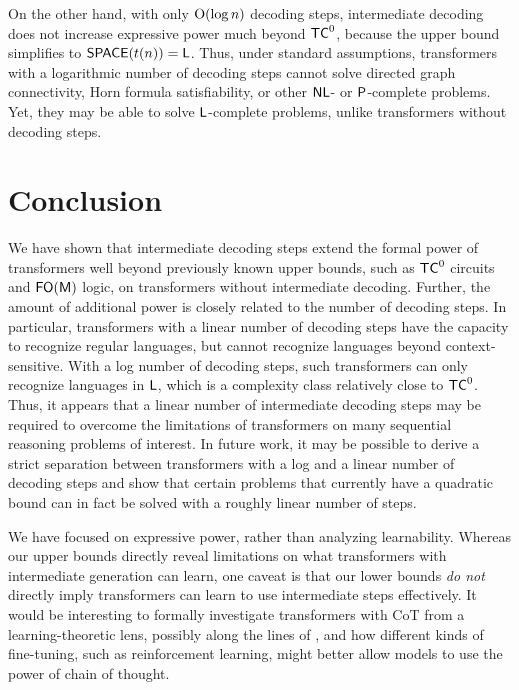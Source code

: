 \documentclass{article} %
\begin{document}
On the other hand, with only $\O(\log n)$ decoding steps, intermediate decoding does not increase expressive power much beyond $\TC^0$, because the upper bound simplifies to $\SPACE(t(n)) = \L$.
Thus, under standard assumptions, transformers with a logarithmic number of decoding steps cannot solve directed graph connectivity, Horn formula satisfiability, or other $\NL$- or $\P$-complete problems. Yet, they may be able to solve $\L$-complete problems, unlike transformers without decoding steps.

\section{Conclusion}

We have shown that intermediate decoding steps extend the formal power of transformers well beyond previously known upper bounds, such as $\TC^0$ circuits and $\FOM$ logic, on transformers without intermediate decoding. Further, the amount of additional power is closely related to the number of decoding steps. In particular, transformers with a linear number of decoding steps have the capacity to recognize regular languages, but cannot recognize languages beyond context-sensitive. With a log number of decoding steps, such transformers can only recognize languages in $\L$, which is a complexity class relatively close to $\TC^0$. Thus, it appears that a linear number of intermediate decoding steps may be required to overcome the limitations of transformers on many sequential reasoning problems of interest.
In future work, it may be possible to derive a strict separation between transformers with a log and a linear number of decoding steps and show that certain problems that currently have a quadratic bound can in fact be solved with a roughly linear number of steps.


We have focused on expressive power, rather than analyzing learnability. 
Whereas our upper bounds directly reveal limitations on what transformers with intermediate generation can learn, one caveat is that our lower bounds \emph{do not} directly imply transformers can learn to use intermediate steps effectively.
It would be interesting to formally investigate transformers with CoT from a learning-theoretic lens, possibly along the lines of \citet{malach2023autoregressive}, and how different kinds of fine-tuning, such as reinforcement learning, might better allow models to use the power of chain of thought.
\end{document}
